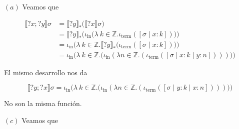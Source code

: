 \documentclass[a4paper, 12pt]{article}
\begin{document}
$(a)$ Veamos que 

\begin{align*}
  \llbracket ?x;?y \rrbracket\sigma 
  &= \llbracket ?y \rrbracket_* \big( \llbracket ?x \rrbracket\sigma \big) \\ 
  &=\llbracket ?y \rrbracket_*\Big( \iota_{\text{in}}\big( \lambda ~ k \in
  \mathbb{Z} . \iota_{\text{term}}\left( [\sigma \mid x : k] \right)  \big)
\Big) \\ 
  &= \iota_{\text{in}}\Big( \lambda ~ k \in \mathbb{Z}. \llbracket ?y
  \rrbracket_*\big( \iota_{\text{term}}([\sigma \mid x : k]) \big) \Big) \\ 
  &= \iota_{\text{in}} \Big( \lambda ~ k \in \mathbb{Z}. \Big( \iota_{\text{in}}
  \left( \lambda n \in \mathbb{Z}. \left( \iota_{\text{term}}([\sigma \mid x : k
\mid y : n]) \right)  \right) \Big) \Big)
\end{align*}

El mismo desarrollo nos da 

\begin{equation*}
  \llbracket ?y;?x \rrbracket\sigma = 
  \iota_{\text{in}} \Big( \lambda ~ k \in \mathbb{Z}. \Big( \iota_{\text{in}}
  \left( \lambda n \in \mathbb{Z}. \left( \iota_{\text{term}}([\sigma \mid y : k
\mid x : n]) \right)  \right) \Big) \Big)
\end{equation*}

No son la misma función.

$(c)$ Veamos que 
\end{document}
